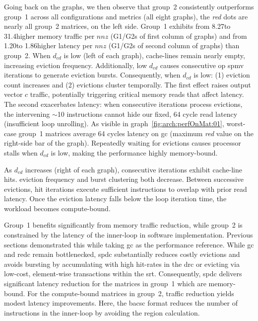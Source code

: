 Going back on the graphs, we then observe that group~2 consistently outperforms group~1 across all configurations and metrics (all eight graphs), \eg the \textit{red} dots are nearly all group~2 matrices, on the left side.
Group~1 exhibits from 8.27\tms to 31.4\tms higher memory traffic per $\mathit{nnz}$ (G1/G2s of first column of graphs) and from 1.20\tms to 1.86\tms higher latency per $\mathit{nnz}$ (G1/G2s of second column of graphs) than group~2.
When $d_\mathit{cd}$ is low (left of each graph), cache-lines remain nearly empty, increasing \gls{eviction} frequency.
Additionally, low $d_\mathit{cd}$ causes consecutive \acrshort{op} \acrshort{spmv} iterations to generate \gls{eviction} bursts.
Consequently, when $d_\mathit{cd}$ is low: (1) \gls{eviction} count increases and (2) \glspl{eviction} cluster temporally.
The first effect raises output vector $c$ traffic, potentially triggering critical memory reads that affect latency.
The second exacerbates latency: when consecutive iterations process \glspl{eviction}, the intervening $\sim$10 instructions cannot hide our fixed, 64 cycle read latency (insufficient loop unrolling).
As visible in graph~\ref{fig:arch:perfOnMat:01}, worst-case group~1 matrices average 64 cycles latency on \acrshort{gc} (maximum \textit{red} value on the right-side bar of the graph).
Repeatedly waiting for \glspl{eviction} causes processor stalls when $d_\mathit{cd}$ is low, making the performance highly memory-bound.

As $d_\mathit{cd}$ increases (right of each graph), consecutive iterations exhibit cache-line \glspl{hit}.
\Gls{eviction} frequency and burst clustering both decrease.
Between successive \glspl{eviction}, \gls{hit} iterations execute sufficient instructions to overlap with prior read latency.
Once the \gls{eviction} latency falls below the loop iteration time, the workload becomes compute-bound.

Group~1 benefits significantly from memory traffic reduction, while group~2 is constrained by the latency of the inner-loop in software implementation.
Previous sections demonstrated this while taking \acrshort{gc} as the performance reference.
While \acrshort{gc} and \acrshort{redc} remain bottlenecked, \acrlong{spdc} substantially reduces costly \glspl{eviction} and avoids bursting by accumulating with high \gls{hit}-rates in the \acrshort{drc} or evicting via low-cost, element-wise transactions within the \acrshort{srt}.
Consequently, \acrlong{spdc} delivers significant latency reduction for the matrices in group~1 which are memory-bound.
For the compute-bound matrices in group~2, traffic reduction yields modest latency improvements.
Here, the \acrshort{bacsc} format reduces the number of instructions in the inner-loop by avoiding the region calculation.

